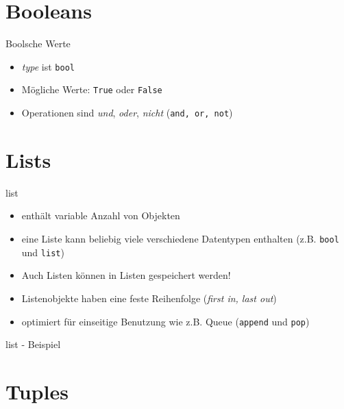 \section{Booleans}

\begin{frame}{Boolsche Werte}
	\begin{itemize}
		\item \textit{type} ist \alert{\texttt{bool}}
		\item Mögliche Werte: \texttt{True} oder \texttt{False}
		\item Operationen sind \textit{und}, \textit{oder}, \textit{nicht} (\texttt{and, or, not})
	\end{itemize}
\end{frame}


\section{Lists}

\begin{frame}{list}
	\begin{itemize}
		\item enthält variable Anzahl von Objekten
		\item eine Liste kann beliebig viele verschiedene Datentypen enthalten (z.B. \texttt{bool} und \texttt{list})
		\item Auch Listen können in Listen gespeichert werden!
		\item Listenobjekte haben eine feste Reihenfolge (\textit{first in, last out})
		\item optimiert für einseitige Benutzung wie z.B. Queue (\alert{\texttt{append}} und \alert{\texttt{pop}})
	\end{itemize}
\end{frame}

\begin{frame}{list - Beispiel}
	
\end{frame}


\section{Tuples}

